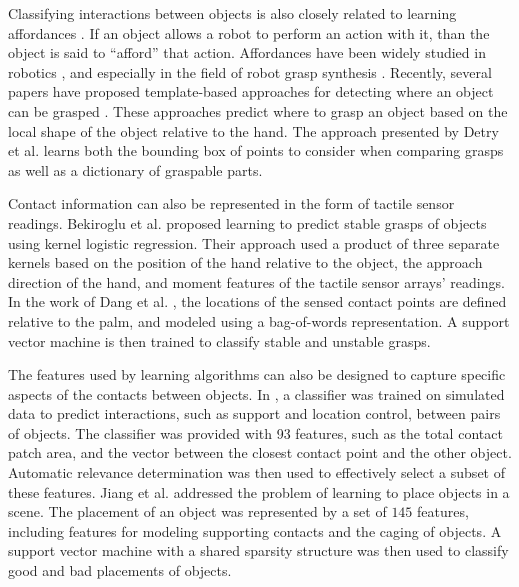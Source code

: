 Classifying interactions between objects is also closely related to
learning affordances \cite{gibson1979}. If an object allows a robot
to perform an action with it, than the object is said to ``afford''
that action. Affordances have been widely studied in robotics \cite{ToAffordorNottoAfford,koppula2013_anticipatingactivities,MontesanoBayesNetAffordance},
and especially in the field of robot grasp synthesis \cite{GraspSurveyBohg}.
Recently, several papers have proposed template-based approaches for
detecting where an object can be grasped \cite{Herzog_AR_2013,detry2012a,Kroemer_ICRA_2012}.
These approaches predict where to grasp an object based on the local
shape of the object relative to the hand. The approach presented by
Detry et al. \cite{detry2012a} learns both the bounding box of points
to consider when comparing grasps as well as a dictionary of graspable
parts. 

Contact information can also be represented in the form of tactile
sensor readings. Bekiroglu et al. \cite{bekiroglu2011d} proposed
learning to predict stable grasps of objects using kernel logistic
regression. Their approach used a product of three separate kernels
based on the position of the hand relative to the object, the approach
direction of the hand, and moment features of the tactile sensor arrays'
readings. In the work of Dang et al. \cite{DangA12Bag-of-features},
the locations of the sensed contact points are defined relative to
the palm, and modeled using a bag-of-words representation. A support
vector machine is then trained to classify stable and unstable grasps.

The features used by learning algorithms can also be designed to capture
specific aspects of the contacts between objects. In \cite{SimulatedAffordanceLearning},
a classifier was trained on simulated data to predict interactions,
such as support and location control, between pairs of objects. The
classifier was provided with 93 features, such as the total contact
patch area, and the vector between the closest contact point and the
other object. Automatic relevance determination was then used to effectively
select a subset of these features. Jiang et al. \cite{objectPlacementYun}
addressed the problem of learning to place objects in a scene. The
placement of an object was represented by a set of $145$ features,
including features for modeling supporting contacts and the caging
of objects. A support vector machine with a shared sparsity structure
was then used to classify good and bad placements of objects. 


